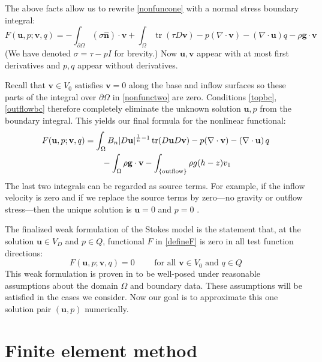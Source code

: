 \documentclass[letterpaper,final,12pt,reqno]{amsart}
\newcommand{\trace}{\operatorname{tr}}
\newcommand{\hbn}{\hat{\mathbf{n}}}
\newcommand{\bu}{\mathbf{u}}
\newcommand{\bv}{\mathbf{v}}
\begin{document}
The above facts allow us to rewrite \eqref{nonfuncone} with a normal stress boundary integral:
\begin{equation}
F(\bu,p;\bv,q) = -\int_{\partial\Omega} (\sigma \hbn)\cdot \bv + \int_\Omega \trace(\tau D\bv) - p (\nabla \cdot \bv) - \left(\nabla \cdot \bu\right) q - \rho \mathbf{g} \cdot \bv \label{nonfunctwo}
\end{equation}
(We have denoted $\sigma=\tau-pI$ for brevity.)  Now $\bu,\bv$ appear with at most first derivatives and $p,q$ appear without derivatives.

Recall that $\bv\in V_0$ satisfies $\bv=0$ along the base and inflow surfaces so these parts of the integral over $\partial\Omega$ in \eqref{nonfunctwo} are zero.  Conditions \eqref{topbc}, \eqref{outflowbc} therefore completely eliminate the unknown solution $\bu,p$ from the boundary integral.  This yields our final formula for the nonlinear functional:
\begin{align}
F(\bu,p;\bv,q) &= \int_\Omega B_n |D\bu|^{\frac{1}{n} - 1} \trace(D\bu D\bv) - p (\nabla \cdot \bv) - \left(\nabla \cdot \bu\right) q \label{defineF} \\
    &\qquad  - \int_\Omega \rho \mathbf{g} \cdot \bv - \int_{\{\text{outflow}\}} \rho g (h-z) v_1  \notag
\end{align}
The last two integrals can be regarded as source terms.  For example, if the inflow velocity is zero and if we replace the source terms by zero---no gravity or outflow stress---then the unique solution is $\bu=0$ and $p=0$ \cite{Elmanetal2014}.

The finalized weak formulation of the Stokes model is the statement that, at the solution $\bu\in V_D$ and $p\in Q$, functional $F$ in \eqref{defineF} is zero in all test function directions:
\begin{equation}
F(\bu,p;\bv,q) = 0 \qquad \text{ for all } \bv\in V_0 \text{ and } q\in Q  \label{weak}
\end{equation}
This weak formulation is proven in \cite[Theorem 3.8]{JouvetRappaz2011} to be well-posed under reasonable assumptions about the domain $\Omega$ and boundary data.  These assumptions will be satisfied in the cases we consider.  Now our goal is to approximate this one solution pair $(\bu,p)$ numerically.


\section{Finite element method} \label{sec:femethod}
\end{document}
